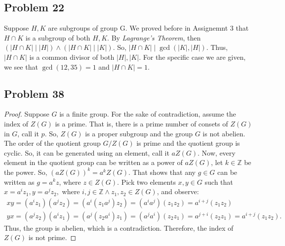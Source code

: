 \documentclass[a4paper,12pt]{article}
\begin{document}
\subsection*{Problem 22}
Suppose $H,K$ are subgroups of group G. We proved before in Assignemnt 3 that $H \cap K$ is a subgroup of both $H,K$. By \textit{Lagrange's Theorem}, then $(|H \cap K| \mid |H|) \wedge (|H \cap K| \mid |K|)$. So, $|H \cap K| \mid \gcd(|K|, |H|).$ Thus, $|H \cap K|$ is a common divisor of both $|H|, |K|$.
For the specific case we are given, we see that $\gcd(12,35)=1$ and $|H \cap K|=1.$
\subsection*{Problem 38}
    \begin{proof}
        Suppose $G$ is a finite group. For the sake of contradiction, assume the index of $Z(G)$ is a prime. That is, there is a prime number of consets of $Z(G)$ in $G$, call it $p$. So, $Z(G)$ is a proper subgroup and the group $G$ is not abelien. The order of the quotient group $G/Z(G)$ is prime and the quotient group is cyclic. So, it can be generated using an element, call it $aZ(G).$ Now, every element in the quotient group can be written as a power of $aZ(G)$, let $k\in \mathbb{Z}$ be the power. So, $(aZ(G))^k=a^kZ(G).$
        That shows that any $g \in G$ can be written as $g=a^kz$, where $z\in Z(G).$ Pick two elements $x,y \in G$ such that $x=a^iz_1, y=a^jz_2,$ where $i,j\in \mathbb{Z} \wedge z_1,z_2\in Z(G)$, and observe:
        \begin{align*}
            xy=(a^iz_1)(a^jz_2)=(a^i(z_1a^j)z_2)=(a^ia^j)(z_1z_2)=a^{i+j}(z_1z_2)\\
            yx=(a^jz_2)(a^iz_1)=(a^j(z_2a^i)z_1)=(a^ja^i)(z_2z_1)=a^{j+i}(z_2z_1)=a^{i+j}(z_1z_2).
        \end{align*}
        Thus, the group is abelien, which is a contradiction. Therefore, the index of $Z(G)$ is not prime.
    \end{proof}
\end{document}
